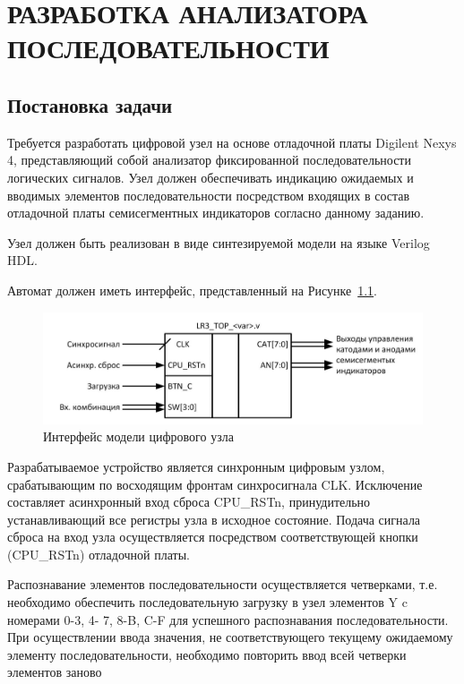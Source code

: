 \chapter{РАЗРАБОТКА АНАЛИЗАТОРА ПОСЛЕДОВАТЕЛЬНОСТИ}
\section{Постановка задачи}	



Требуется разработать цифровой узел на основе отладочной платы Digilent Nexys 4,
представляющий собой анализатор фиксированной последовательности логических
сигналов. Узел должен обеспечивать индикацию ожидаемых и вводимых элементов
последовательности посредством входящих в состав отладочной платы семисегментных
индикаторов согласно данному заданию.

Узел должен быть реализован в виде синтезируемой модели на языке Verilog HDL.

Автомат должен иметь интерфейс, представленный на Рисунке~\ref{fig:interface-pract3}.

\begin{figure}[h!]
	\centering
	\includegraphics[width=0.7\linewidth]{course-plis/images/lab3/interface-pract3}
	\caption{Интерфейс модели цифрового узла}
	\label{fig:interface-pract3}
\end{figure}


Разрабатываемое устройство является синхронным цифровым узлом,
срабатывающим по восходящим фронтам синхросигнала CLK. Исключение составляет
асинхронный вход сброса CPU\_RSTn, принудительно устанавливающий все регистры
узла в исходное состояние. Подача сигнала сброса на вход узла осуществляется
посредством соответствующей кнопки (CPU\_RSTn) отладочной платы.

Распознавание элементов последовательности осуществляется четверками, т.е.
необходимо обеспечить последовательную загрузку в узел элементов Y c номерами 0-3, 4-
7, 8-B, C-F для успешного распознавания последовательности. При осуществлении ввода
значения, не соответствующего текущему ожидаемому элементу последовательности,
необходимо повторить ввод всей четверки элементов заново




